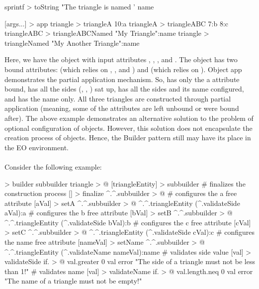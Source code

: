 \documentclass[12pt]{book}
\begin{document}
{{\begin{ffcode}
  sprintf > toString
    "The triangle is named '%
    name


[args...] > app
  triangle > triangleA
    10:a
  triangleA > triangleABC
    7:b
    8:c
  triangleABC > triangleABCNamed
   "My Triangle":name
  triangle > triangleNamed
    "My Another Triangle":name
\end{ffcode}

Here, we have the  object with input attributes , , , and . The  object has two bound attributes:  (which relies on , , and ) and  (which relies on ). Object app demonstrates the partial application mechanism. So,  has only the a attribute bound,  has all the sides (, , ) sat up,  has all the sides and its name configured, and  has the name only. All three triangles are constructed through partial application (meaning, some of the attributes are left unbound or were bound after). The above example demonstrates an alternative solution to the problem of optional configuration of objects. However, this solution does not encapsulate the creation process of objects. Hence, the Builder pattern still may have its place in the EO environment.
\\
\\
Consider the following example:

\begin{ffcode}
[] > builder
  subbuilder triangle > @
  [triangleEntity] > subbuilder
    # finalizes the construction process
    [] > finalize
      ^.^.subbuilder > @
    # configures the a free attribute
    [aVal] > setA
      ^.^.subbuilder > @
        ^.^.triangleEntity
          (^.validateSide aVal):a
    # configures the b free attribute
    [bVal] > setB
      ^.^.subbuilder > @
        ^.^.triangleEntity
          (^.validateSide bVal):b
    # configures the c free attribute
    [cVal] > setC
      ^.^.subbuilder > @
        ^.^.triangleEntity
          (^.validateSide cVal):c
    # configures the name free attribute
    [nameVal] > setName
      ^.^.subbuilder > @
        ^.^.triangleEntity
          (^.validateName nameVal):name
    # validates side value
    [val] > validateSide
      if. > @
        val.greater 0
        val
        error
          "The side of a triangle must not 
          be less than 1!"
    # validates name
    [val] > validateName
      if. > @
        val.length.neq 0
        val
        error
          "The name of a triangle must not be empty!"


\end{ffcode}}}
\end{document}
